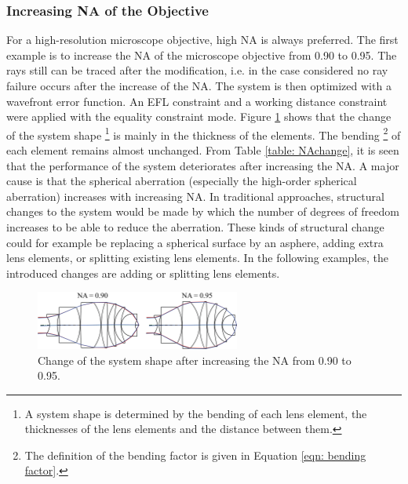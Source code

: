 \subsubsection{Increasing NA of the Objective}
For a high-resolution microscope objective, high NA is always preferred. The first example is to increase the NA of the microscope objective from 0.90 to 0.95. The rays still can be traced after the modification, i.e. in the case considered no ray failure occurs after the increase of the NA. The system is then optimized with a wavefront error function. An EFL constraint and a working distance constraint were applied with the equality constraint mode. Figure \ref{fig: vollrathNA90295} shows that the change of the system shape \footnote{A system shape is determined by the bending of each lens element, the thicknesses of the lens elements and  the distance between them.} is mainly in the thickness of the elements. The bending \footnote{The definition of the bending factor is given in Equation \ref{eqn: bending factor}.} of each element remains almost unchanged. From Table \ref{table: NAchange}, it is seen that the performance of the system deteriorates after increasing the NA. A major cause is that the spherical aberration (especially the high-order spherical aberration) increases with increasing NA. In traditional approaches, structural changes to the system would be made by which the number of degrees of freedom increases to be able to reduce the aberration. These kinds of structural change could for example be replacing a spherical surface by an asphere, adding extra lens elements, or splitting existing lens elements. In the following examples, the introduced changes are adding or splitting lens elements.

\begin{figure}[h!]
    \centering
    \includegraphics[width=0.6\textwidth]{chapter-4/figures/Vollrath_NA90295.png}
    \caption{Change of the system shape after increasing the NA from 0.90 to 0.95.}
    \label{fig: vollrathNA90295}
\end{figure}

